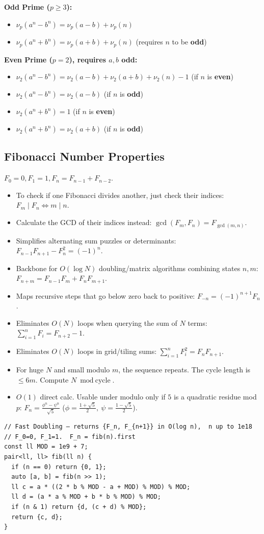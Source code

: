 \textbf{Odd Prime ($p \ge 3$):}
\begin{itemize}
  \item $\nu_p(a^n - b^n) = \nu_p(a-b) + \nu_p(n)$
  \item $\nu_p(a^n + b^n) = \nu_p(a+b) + \nu_p(n)$ \quad (requires $n$ to be \textbf{odd})
\end{itemize}

\textbf{Even Prime ($p = 2$), requires $a,b$ \textbf{odd}:}
\begin{itemize}
  \item $\nu_2(a^n - b^n) = \nu_2(a-b) + \nu_2(a+b) + \nu_2(n) - 1$ \quad (if $n$ is \textbf{even})
  \item $\nu_2(a^n - b^n) = \nu_2(a-b)$ \quad (if $n$ is \textbf{odd})
  \item $\nu_2(a^n + b^n) = 1$ \quad (if $n$ is \textbf{even})
  \item $\nu_2(a^n + b^n) = \nu_2(a+b)$ \quad (if $n$ is \textbf{odd})
\end{itemize}

\subsection{Fibonacci Number Properties}
$F_0 = 0, F_1 = 1, F_n = F_{n-1} + F_{n-2}$.
\begin{itemize}
  \item To check if one Fibonacci divides another, just check their indices: $F_m \mid F_n \iff m \mid n$.
  \item Calculate the GCD of their indices instead: $\gcd(F_m, F_n) = F_{\gcd(m,n)}$.
  \item Simplifies alternating sum puzzles or determinants: $F_{n-1}F_{n+1} - F_n^2 = (-1)^n$.
  \item Backbone for $O(\log N)$ doubling/matrix algorithms combining states $n,m$: $F_{n+m} = F_{n-1}F_m + F_nF_{m+1}$.
  \item Maps recursive steps that go below zero back to positive: $F_{-n} = (-1)^{n+1}F_n$.
  \item Eliminates $O(N)$ loops when querying the sum of $N$ terms: $\sum_{i=1}^n F_i = F_{n+2} - 1$.
  \item Eliminates $O(N)$ loops in grid/tiling sums: $\sum_{i=1}^n F_i^2 = F_nF_{n+1}$.
  \item For huge $N$ and small modulo $m$, the sequence repeats. The cycle length is $\le 6m$. Compute $N \bmod \text{cycle}$.
  \item $O(1)$ direct calc. Usable under modulo only if $5$ is a quadratic residue mod $p$: $F_n = \frac{\phi^n - \psi^n}{\sqrt{5}}$ ($\phi = \frac{1+\sqrt{5}}{2},\ \psi = \frac{1-\sqrt{5}}{2}$).
\end{itemize}

\begin{verbatim}
// Fast Doubling — returns {F_n, F_{n+1}} in O(log n),  n up to 1e18
// F_0=0, F_1=1.  F_n = fib(n).first
const ll MOD = 1e9 + 7;
pair<ll, ll> fib(ll n) {
  if (n == 0) return {0, 1};
  auto [a, b] = fib(n >> 1);
  ll c = a * ((2 * b % MOD - a + MOD) % MOD) % MOD;
  ll d = (a * a % MOD + b * b % MOD) % MOD;
  if (n & 1) return {d, (c + d) % MOD};
  return {c, d};
}
\end{verbatim}

